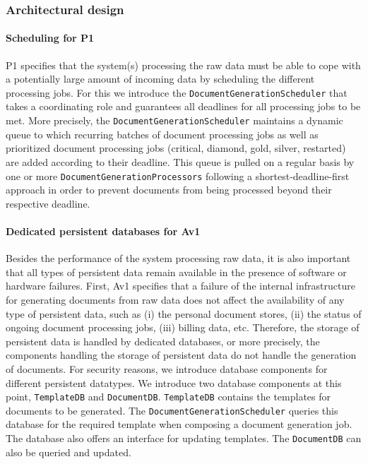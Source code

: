 \documentclass[a4paper,10pt]{article}
\begin{document}
\subsubsection{Architectural design}
\paragraph{Scheduling for P1}
P1 specifies that the system(s) processing the raw data must be able to cope with a potentially large amount of incoming data by scheduling the different processing jobs. For this we introduce the \texttt{DocumentGenerationScheduler} that takes a coordinating role and guarantees all deadlines for all processing jobs to be met. More precisely, the \texttt{DocumentGenerationScheduler} maintains a dynamic queue to which recurring batches of document processing jobs as well as prioritized document processing jobs (critical, diamond, gold, silver, restarted) are added according to their deadline. This queue is pulled on a regular basis by one or more \texttt{DocumentGenerationProcessors} following a shortest-deadline-first approach in order to prevent documents from being processed beyond their respective deadline.

\paragraph{Dedicated persistent databases for Av1}
Besides the performance of the system processing raw data, it is also important that all types of persistent data remain available in the presence of software or hardware failures.
First, Av1 specifies that a failure of the internal infrastructure for generating documents from raw data does not affect the availability of any type of persistent data, such as (i) the personal document stores, (ii) the status of ongoing document processing jobs, (iii) billing data, etc. Therefore, the storage of persistent data is handled by dedicated databases, or more precisely, the components handling the storage of persistent data do not handle the generation of documents. For security reasons, we introduce database components for different persistent datatypes. We introduce two database components at this point, \texttt{TemplateDB} and \texttt{DocumentDB}. \texttt{TemplateDB} contains the templates for documents to be generated. The \texttt{DocumentGenerationScheduler} queries this database for the required template when composing a document generation job.  The database also offers an interface for updating templates. The \texttt{DocumentDB} can also be queried and updated.
\end{document}
